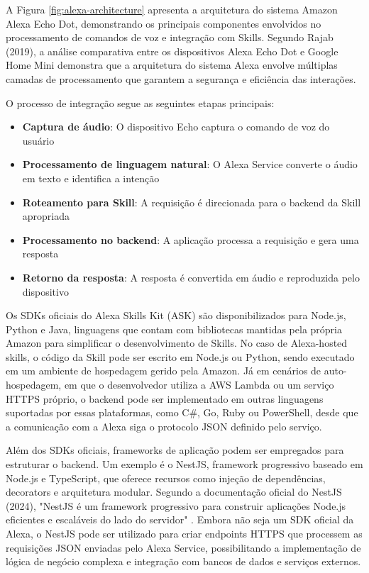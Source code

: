 A Figura \ref{fig:alexa-architecture} apresenta a arquitetura do sistema Amazon Alexa Echo Dot, demonstrando os principais componentes envolvidos no processamento de comandos de voz e integração com Skills. Segundo Rajab (2019), a análise comparativa entre os dispositivos Alexa Echo Dot e Google Home Mini demonstra que a arquitetura do sistema Alexa envolve múltiplas camadas de processamento que garantem a segurança e eficiência das interações.

O processo de integração segue as seguintes etapas principais:

\begin{itemize}
    \item \textbf{Captura de áudio}: O dispositivo Echo captura o comando de voz do usuário
    \item \textbf{Processamento de linguagem natural}: O Alexa Service converte o áudio em texto e identifica a intenção
    \item \textbf{Roteamento para Skill}: A requisição é direcionada para o backend da Skill apropriada
    \item \textbf{Processamento no backend}: A aplicação processa a requisição e gera uma resposta
    \item \textbf{Retorno da resposta}: A resposta é convertida em áudio e reproduzida pelo dispositivo
\end{itemize}



Os SDKs oficiais do Alexa Skills Kit (ASK) são disponibilizados para Node.js, Python e Java, linguagens que contam com bibliotecas mantidas pela própria Amazon para simplificar o desenvolvimento de Skills.
No caso de Alexa-hosted skills, o código da Skill pode ser escrito em Node.js ou Python, sendo executado em um ambiente de hospedagem gerido pela Amazon.
Já em cenários de auto-hospedagem, em que o desenvolvedor utiliza a AWS Lambda ou um serviço HTTPS próprio, o backend pode ser implementado em outras linguagens suportadas por essas plataformas, como C\#, Go, Ruby ou PowerShell, desde que a comunicação com a Alexa siga o protocolo JSON definido pelo serviço.

Além dos SDKs oficiais, frameworks de aplicação podem ser empregados para estruturar o backend. Um exemplo é o NestJS, framework progressivo baseado em Node.js e TypeScript, que oferece recursos como injeção de dependências, decorators e arquitetura modular.
Segundo a documentação oficial do NestJS (2024), "NestJS é um framework progressivo para construir aplicações Node.js eficientes e escaláveis do lado do servidor" \cite{nestjs2024}.
Embora não seja um SDK oficial da Alexa, o NestJS pode ser utilizado para criar endpoints HTTPS que processem as requisições JSON enviadas pelo Alexa Service, possibilitando a implementação de lógica de negócio complexa e integração com bancos de dados e serviços externos.

